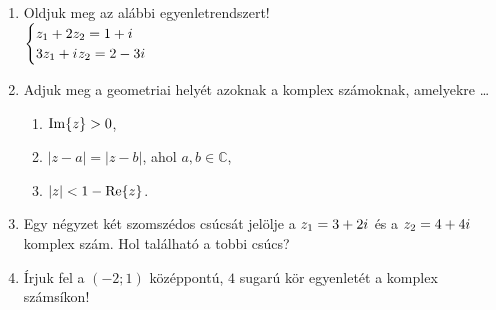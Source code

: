\documentclass[a4paper, 12pt]{scrartcl}
\begin{document}
\begin{enumerate}
  \item Oldjuk meg az alábbi egyenletrendszert!\\[2mm]
        \hspace{2ex}$
          \begin{cases}
            z_1 + 2z_2 = 1 + {i\mkern1mu}    \\
            3z_1 + {i\mkern1mu} z_2 = 2 - 3i \\
          \end{cases}
        $

  \item Adjuk meg a geometriai helyét azoknak a komplex számoknak, amelyekre
        \dots
        \begin{enumerate}
          \item $\operatorname{Im} \{ z \} > 0$,
          \item $|z - a| = |z - b|$, ahol $a, b \in \mathbb C$,
          \item $|z| < 1 - \operatorname{Re} \{ z \}$.
        \end{enumerate}

  \item Egy négyzet két szomszédos csúcsát jelölje a $z_1 = 3 + 2 {i\mkern1mu}$ és a
        $z_2 = 4 + 4 {i\mkern1mu}$ komplex szám. Hol található a tobbi csúcs?

  \item Írjuk fel a $(-2; 1)$ középpontú, $4$ sugarú kör egyenletét a komplex
        számsíkon!
\end{enumerate}

\end{document}
